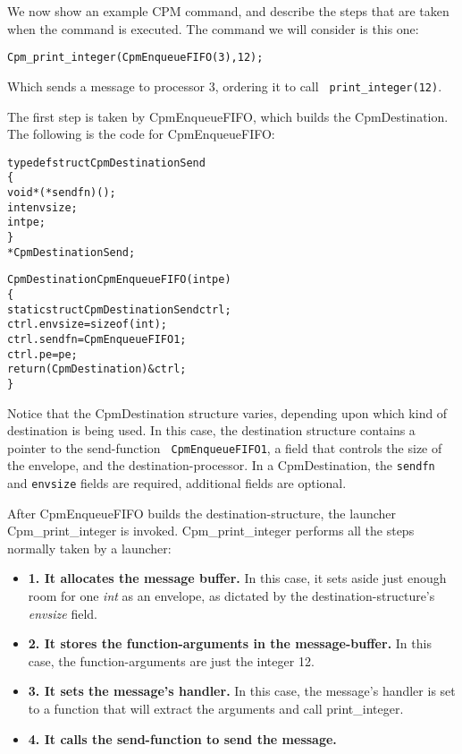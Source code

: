 We now show an example CPM command, and describe the steps that are
taken when the command is executed.  The command we will consider is
this one:

\begin{alltt}
Cpm_print_integer(CpmEnqueueFIFO(3), 12);
\end{alltt}

Which sends a message to processor 3, ordering it to call {\tt
print\_integer(12)}.

The first step is taken by CpmEnqueueFIFO, which builds the
CpmDestination.  The following is the code for CpmEnqueueFIFO:

\pagebreak

\begin{alltt}
typedef struct CpmDestinationSend
\{
  void *(*sendfn)();
  int envsize;
  int pe;
\}
*CpmDestinationSend;

CpmDestination CpmEnqueueFIFO(int pe)
\{
  static struct CpmDestinationSend ctrl;
  ctrl.envsize = sizeof(int);
  ctrl.sendfn  = CpmEnqueueFIFO1;
  ctrl.pe = pe;
  return (CpmDestination)&ctrl;
\}
\end{alltt}

Notice that the CpmDestination structure varies, depending upon which
kind of destination is being used.  In this case, the destination
structure contains a pointer to the send-function {\tt
CpmEnqueueFIFO1}, a field that controls the size of the envelope, and
the destination-processor.  In a CpmDestination, the {\tt sendfn} and
{\tt envsize} fields are required, additional fields are optional.

After CpmEnqueueFIFO builds the destination-structure, the launcher
Cpm\_print\_integer is invoked.  Cpm\_print\_integer performs all the
steps normally taken by a launcher:

\begin{itemize}

\item[]{{\bf 1. It allocates the message buffer.}  In this case, it sets aside
just enough room for one {\it int} as an envelope, as dictated by the
destination-structure's {\it envsize} field.}

\item[]{{\bf 2. It stores the function-arguments in the message-buffer.}  In
this case, the function-arguments are just the integer 12.}

\item[]{{\bf 3. It sets the message's handler.}  In this case, the message's
handler is set to a function that will extract the arguments and call
print\_integer.}

\item[]{{\bf 4. It calls the send-function to send the message.}}
\end{itemize}

